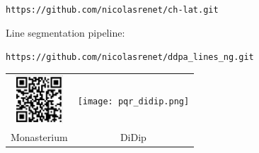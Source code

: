 \documentclass[a0paper,portrait]{baposter}
\begin{document}
\begin{poster}
{	{\footnotesize \texttt{https://github.com/nicolasrenet/ch-lat.git}}
\vspace{1em}

	Line segmentation pipeline:
	
	{\footnotesize \texttt{https://github.com/nicolasrenet/ddpa\_lines\_ng.git}}
\begin{center}
\begin{tabular}{cc}
\includegraphics[width=1.8cm]{monasterium_qrcode.png} & 
\texttt{[image: pqr\_didip.png]} \\
	Monasterium & DiDip
\end{tabular}
\end{center}
}


\end{poster}
\end{document}
